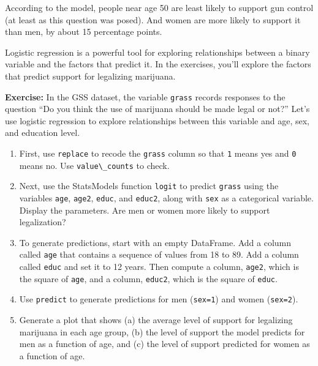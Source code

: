 According to the model, people near age 50 are least likely to support
gun control (at least as this question was posed). And women are more
likely to support it than men, by about 15 percentage points.

Logistic regression is a powerful tool for exploring relationships
between a binary variable and the factors that predict it. In the
exercises, you'll explore the factors that predict support for
legalizing marijuana.

\textbf{Exercise:} In the GSS dataset, the variable
\passthrough{\lstinline!grass!} records responses to the question ``Do
you think the use of marijuana should be made legal or not?'' Let's use
logistic regression to explore relationships between this variable and
age, sex, and education level.

\begin{enumerate}
\def\labelenumi{\arabic{enumi}.}
\item
  First, use \passthrough{\lstinline!replace!} to recode the
  \passthrough{\lstinline!grass!} column so that
  \passthrough{\lstinline!1!} means yes and \passthrough{\lstinline!0!}
  means no. Use \passthrough{\lstinline!value\_counts!} to check.
\item
  Next, use the StatsModels function \passthrough{\lstinline!logit!} to
  predict \passthrough{\lstinline!grass!} using the variables
  \passthrough{\lstinline!age!}, \passthrough{\lstinline!age2!},
  \passthrough{\lstinline!educ!}, and \passthrough{\lstinline!educ2!},
  along with \passthrough{\lstinline!sex!} as a categorical variable.
  Display the parameters. Are men or women more likely to support
  legalization?
\item
  To generate predictions, start with an empty DataFrame. Add a column
  called \passthrough{\lstinline!age!} that contains a sequence of
  values from 18 to 89. Add a column called
  \passthrough{\lstinline!educ!} and set it to 12 years. Then compute a
  column, \passthrough{\lstinline!age2!}, which is the square of
  \passthrough{\lstinline!age!}, and a column,
  \passthrough{\lstinline!educ2!}, which is the square of
  \passthrough{\lstinline!educ!}.
\item
  Use \passthrough{\lstinline!predict!} to generate predictions for men
  (\passthrough{\lstinline!sex=1!}) and women
  (\passthrough{\lstinline!sex=2!}).
\item
  Generate a plot that shows (a) the average level of support for
  legalizing marijuana in each age group, (b) the level of support the
  model predicts for men as a function of age, and (c) the level of
  support predicted for women as a function of age.
\end{enumerate}

